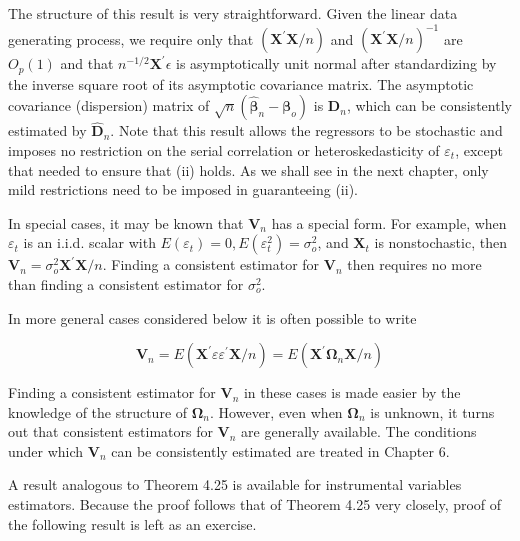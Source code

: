 \documentclass[10pt]{article}
\begin{document}
The structure of this result is very straightforward. Given the linear data generating process, we require only that $\left(\mathbf{X}^{\prime} \mathbf{X} / n\right)$ and $\left(\mathbf{X}^{\prime} \mathbf{X} / n\right)^{-1}$ are $O_{p}(1)$ and that $n^{-1 / 2} \mathbf{X}^{\prime} \epsilon$ is asymptotically unit normal after standardizing by the inverse square root of its asymptotic covariance matrix. The asymptotic covariance (dispersion) matrix of $\sqrt{n}\left(\hat{\boldsymbol{\beta}}_{n}-\boldsymbol{\beta}_{o}\right)$ is $\mathbf{D}_{n}$, which can be consistently estimated by $\hat{\mathbf{D}}_{n}$. Note that this result allows the regressors to be stochastic and imposes no restriction on the serial correlation or heteroskedasticity of $\varepsilon_{t}$, except that needed to ensure that (ii) holds. As we shall see in the next chapter, only mild restrictions need to be imposed in guaranteeing (ii).

In special cases, it may be known that $\mathbf{V}_{n}$ has a special form. For example, when $\varepsilon_{t}$ is an i.i.d. scalar with $E\left(\varepsilon_{t}\right)=0, E\left(\varepsilon_{t}^{2}\right)=\sigma_{o}^{2}$, and $\mathbf{X}_{t}$ is nonstochastic, then $\mathbf{V}_{n}=\sigma_{o}^{2} \mathbf{X}^{\prime} \mathbf{X} / n$. Finding a consistent estimator for $\mathbf{V}_{n}$ then requires no more than finding a consistent estimator for $\sigma_{o}^{2}$.

In more general cases considered below it is often possible to write

$$
\mathbf{V}_{n}=E\left(\mathbf{X}^{\prime} \varepsilon \varepsilon^{\prime} \mathbf{X} / n\right)=E\left(\mathbf{X}^{\prime} \boldsymbol{\Omega}_{n} \mathbf{X} / n\right)
$$

Finding a consistent estimator for $\mathbf{V}_{n}$ in these cases is made easier by the knowledge of the structure of $\boldsymbol{\Omega}_{n}$. However, even when $\boldsymbol{\Omega}_{n}$ is unknown, it turns out that consistent estimators for $\mathbf{V}_{n}$ are generally available. The conditions under which $\mathbf{V}_{n}$ can be consistently estimated are treated in Chapter 6.

A result analogous to Theorem 4.25 is available for instrumental variables estimators. Because the proof follows that of Theorem 4.25 very closely, proof of the following result is left as an exercise.
\end{document}
